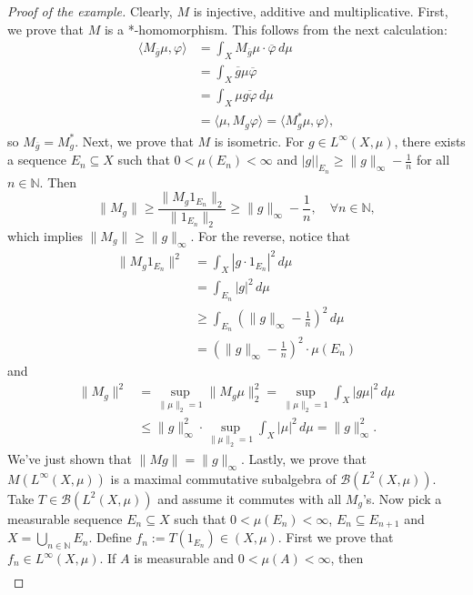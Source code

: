 \documentclass[10pt, a4paper]{article}
\newenvironment{noticeC}{%
  \tcolorbox[%
  notitle,
  empty,
  enhanced,  %
  breakable,
  coltext=black, 
  fontupper=\rmfamily,
  noparskip,
  sharp corners,
  boxrule=-1pt,  %
  frame hidden,
  left=7pt,  %
  right=7pt,
  top=5pt,
  bottom=5pt,
  before skip=2.5ex plus 2pt,
  after skip=2.5ex plus 2pt,
  overlay unbroken and last={%
  },
  ]}
{\endtcolorbox}
\newenvironment{myproof}%
  {\begin{noticeC}\begin{proof}}%
  {\end{proof}\end{noticeC}}
\newcommand{\N}{\mathbb {N}}
\begin{document}
\begin{myproof}[Proof of the example]
  Clearly, $M$ is injective, additive and multiplicative.
  First, we prove that $M$ is a *-homomorphism. This follows from the next calculation:
  \begin{align*}
    \langle M_{\overline{g}} \mu, \varphi \rangle &= \int_X M_{\overline{g}} \mu \cdot \overline{\varphi}\, d\mu\\
    &= \int_X \overline{g}\mu \overline{\varphi}\\
    &= \int_X \mu \overline{g \varphi}\, d\mu\\
    &= \langle \mu, M_g\varphi\rangle = \langle M_g ^* \mu, \varphi \rangle,
  \end{align*}
  so $M_{\overline{g}} = M_g ^*$. Next, we prove that $M$ is isometric.
  For $g \in L^\infty (X, \mu)$, there exists a sequence $E_n \subseteq X$ such that $0 < \mu(E_n) < \infty$
  and $|g|\big|_{E_n} \geq \|g\|_{\infty} -\frac{1}{n}$ for all $n \in \N$.
  Then 
  $$\| M_g \| \geq \frac{\| M_g 1_{E_n}\|_2}{\| 1_{E_n}\|_2} \geq \|g\|_{\infty} - \frac{1}{n},\quad \forall n \in \N,$$
  which implies $\|M_g\| \geq \|g\|_{\infty}$.
  For the reverse, notice that 
  \begin{align*}
    \| M_g 1_{E_n} \|^2 &= \int_X |g \cdot 1_{E_n}|^2\, d\mu\\
    &= \int_{E_n} |g|^2\, d\mu\\
    &\geq \int_{E_n} (\|g\|_{\infty} - \frac{1}{n})^2\, d\mu \\
    &= (\|g\|_\infty -\frac{1}{n})^2 \cdot \mu(E_n)
  \end{align*}
  and 
  \begin{align*}
    \|M_g\|^2 &= \sup_{\| \mu\|_2 = 1} \| M_g \mu\|^2 _2 = \sup_{\| \mu\|_2 = 1} \int_X |g\mu|^2\, d\mu\\
    &\leq \|g\|_{\infty} ^2 \cdot \sup_{\| \mu\|_2 = 1} \int_X |\mu|^2\, d\mu = \|g\|_{\infty} ^2.
  \end{align*}
  We've just shown that $\|Mg\| = \|g\|_{\infty}$.
  Lastly, we prove that $M(L^\infty (X, \mu))$ is a maximal commutative subalgebra of $\mathcal{B}(L^2 (X, \mu))$.
  Take $T \in \mathcal{B}(L^2 (X, \mu))$ and assume it commutes with all $M_g$'s.
  Now pick a measurable sequence $E_n \subseteq X$ such that $0 < \mu(E_n) < \infty$, $E_n \subseteq E_{n + 1}$ and $X = \bigcup_{n \in \N} E_n$.
  Define $f_n := T(1_{E_n}) \in (X, \mu)$. First we prove that $f_n \in L^\infty (X, \mu)$. If $A$ is measurable and $0 < \mu(A) < \infty$, then 
  \begin{align*}

\end{align*}
\end{myproof}
\end{document}
